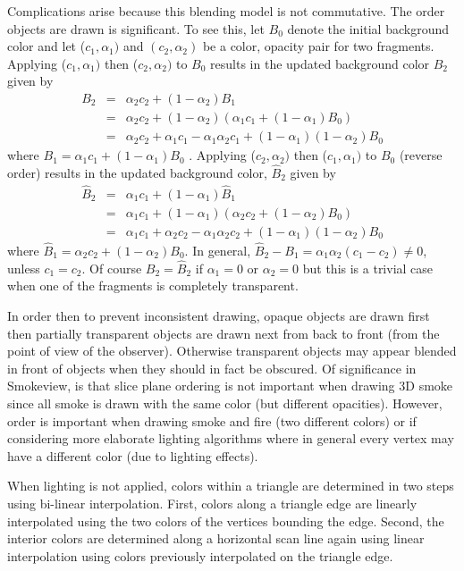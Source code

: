 \documentclass[11pt,twoside]{book}
\begin{document}
Complications arise because this blending model is not commutative.  The order objects are drawn
is significant.
To see this, let $B_0$ denote the initial background color and let ($c_1,\alpha_1)$
and $(c_2,\alpha_2)$ be a color, opacity pair for two fragments.  Applying ($c_1,\alpha_1)$
then ($c_2,\alpha_2)$ to $B_0$ results in the updated background color $B_2$ given by
\begin{eqnarray*}
B_2&=&\alpha_2c_2+(1-\alpha_2)B_1\\
&=&\alpha_2c_2+(1-\alpha_2)(\alpha_1c_1+(1-\alpha_1)B_0)\\
&=&\alpha_2c_2+\alpha_1c_1-\alpha_1\alpha_2c_1+(1-\alpha_1)(1-\alpha_2)B_0
\end{eqnarray*}
where $B_1=\alpha_1c_1+(1-\alpha_1)B_0$ .  Applying ($c_2,\alpha_2)$
then ($c_1,\alpha_1)$ to $B_0$ (reverse order) results in the updated background color, $\hat{B}_2$ given by
\begin{eqnarray*}
\hat{B}_2&=&\alpha_1c_1+(1-\alpha_1)\hat{B}_1\\
&=&\alpha_1c_1+(1-\alpha_1)(\alpha_2c_2+(1-\alpha_2)B_0)\\
&=&\alpha_1c_1+\alpha_2c_2-\alpha_1\alpha_2c_2+(1-\alpha_1)(1-\alpha_2)B_0
\end{eqnarray*}
where $\hat{B}_1=\alpha_2c_2+(1-\alpha_2)B_0$.
In general, $\hat{B}_2-B_1=\alpha_1\alpha_2(c_1-c_2)\ne 0$, unless $c_1=c_2$.  Of course $B_2=\hat{B}_2$ if $\alpha_1=0$ or $\alpha_2=0$ but this is a trivial case when one of the fragments is completely transparent.

In order then to prevent inconsistent drawing, opaque
objects are drawn first then partially transparent objects
are drawn next from back to front (from the point of view of
the observer). Otherwise transparent objects may appear blended in
front of objects when they should in fact be obscured.
Of significance in Smokeview, is that slice plane ordering is not important when drawing 3D smoke since all smoke is drawn with the same color (but different opacities).  However, order is important when drawing smoke and fire (two different colors) or if considering more elaborate lighting algorithms where in general every vertex may have a different color (due to lighting effects).

When lighting is not applied, colors within a triangle are
determined in two steps using bi-linear interpolation. First,
colors along a triangle edge are linearly interpolated using the
two colors of the vertices bounding the edge. Second, the interior
colors are determined along a horizontal scan line again using
linear interpolation using colors previously interpolated on the
triangle edge.
\end{document}
